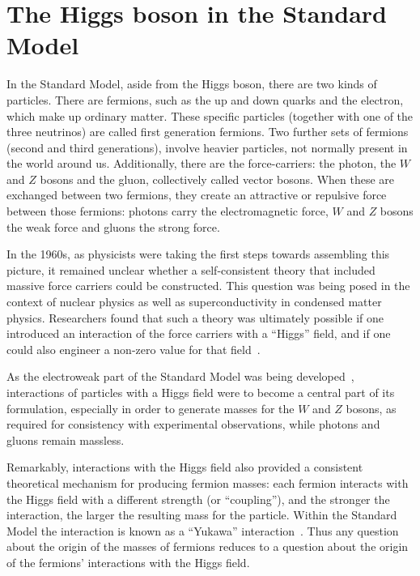 \documentclass{article}
\begin{document}
\section*{The Higgs boson in the Standard Model}

In the Standard Model, aside from the Higgs boson, there are two kinds
of particles.
%
There are fermions, such as the up and down quarks and the electron,
which make up ordinary matter.
%
These specific particles (together with one of the three neutrinos) are
called first generation fermions.
%
Two further sets of fermions (second and third generations), involve
heavier particles, not normally present in the world around us.
%
Additionally, there are the force-carriers: the photon, the $W$ and
$Z$ bosons and the gluon, collectively called vector bosons.
%
When these are exchanged between two fermions, they create an attractive or repulsive  force
between those fermions: photons carry the electromagnetic force, $W$
and $Z$ bosons the weak force and gluons the strong force.



In the 1960s, as physicists were taking the first steps towards assembling this picture, it remained unclear whether a self-consistent theory that included massive force carriers could be constructed.
%
This question was being posed in the context of nuclear physics as well as superconductivity in condensed matter physics. Researchers found that such a theory was ultimately
possible if one introduced an interaction of the force carriers with
a ``Higgs'' field, and if one could also engineer a non-zero value for
that
field~\cite{Anderson:1963pc,Higgs:1964ia,Higgs:1964pj,Englert:1964et,Guralnik:1964eu,Kibble:1967sv}.
% 

As the electroweak part of the Standard Model was being
developed~\cite{Glashow:1961tr,Salam:1964ry,Weinberg:1967tq}, 
interactions of particles with a Higgs field were to become a central part of 
its formulation, especially in order to generate masses for the $W$
and $Z$ bosons, as required for consistency with experimental
observations, while photons and gluons remain massless.

Remarkably, interactions with the Higgs field also provided a consistent
theoretical mechanism for producing fermion masses:
%
each fermion interacts with the Higgs field with a different strength
(or ``coupling''), and the stronger the interaction, the larger the
resulting mass for the particle.
%
Within the Standard Model
the interaction is known as a ``Yukawa''
interaction~\cite{Yukawa:1935xg}.
%
Thus any question about the origin of the masses of fermions reduces
to a question about the origin of the fermions' interactions with the
Higgs field.
%
\end{document}
